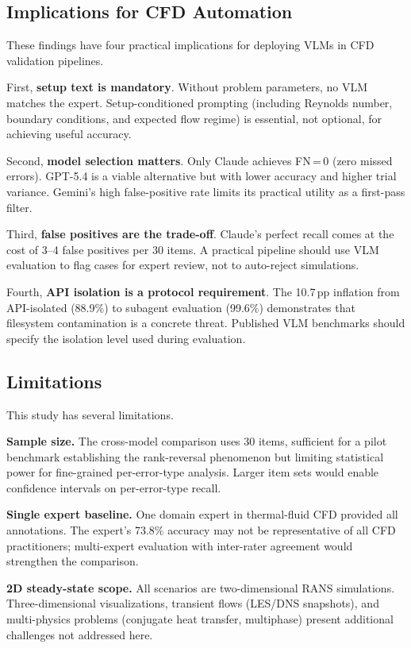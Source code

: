 \documentclass[preprint,12pt]{elsarticle}
\begin{document}
\subsection{Implications for CFD Automation}
\label{sec:implications}

These findings have four practical implications for deploying VLMs in CFD
validation pipelines.

First, \textbf{setup text is mandatory}. Without problem parameters, no VLM
matches the expert. Setup-conditioned prompting (including Reynolds number,
boundary conditions, and expected flow regime) is essential, not optional,
for achieving useful accuracy.

Second, \textbf{model selection matters}. Only Claude achieves FN\,=\,0
(zero missed errors). GPT-5.4 is a viable alternative but with lower accuracy
and higher trial variance. Gemini's high false-positive rate limits its
practical utility as a first-pass filter.

Third, \textbf{false positives are the trade-off}. Claude's perfect recall
comes at the cost of 3--4 false positives per 30 items. A practical pipeline
should use VLM evaluation to flag cases for expert review, not to auto-reject
simulations.

Fourth, \textbf{API isolation is a protocol requirement}. The 10.7\,pp
inflation from API-isolated (88.9\%) to subagent evaluation (99.6\%)
demonstrates that filesystem contamination is a concrete threat. Published VLM
benchmarks should specify the isolation level used during evaluation.

\subsection{Limitations}
\label{sec:limitations}

This study has several limitations.

\textbf{Sample size.} The cross-model comparison uses 30 items, sufficient
for a pilot benchmark establishing the rank-reversal phenomenon but limiting
statistical power for fine-grained per-error-type analysis. Larger item sets
would enable confidence intervals on per-error-type recall.

\textbf{Single expert baseline.} One domain expert in thermal-fluid CFD
provided all annotations. The expert's 73.8\% accuracy may not be
representative of all CFD practitioners; multi-expert evaluation with
inter-rater agreement would strengthen the comparison.

\textbf{2D steady-state scope.} All scenarios are two-dimensional RANS
simulations. Three-dimensional visualizations, transient flows (LES/DNS
snapshots), and multi-physics problems (conjugate heat transfer, multiphase)
present additional challenges not addressed here.
\end{document}
